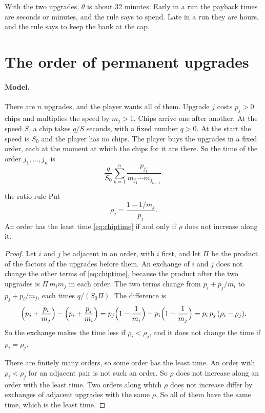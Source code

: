 \documentclass[11pt]{article}
\theoremstyle{boxed}
\begin{document}
With the two upgrades, $\theta$ is about 32 minutes. Early in a run the payback times are
seconds or minutes, and the rule says to spend. Late in a run they are hours, and the rule says
to keep the bank at the cap.

\section{The order of permanent upgrades}\label{sec:chips}

\paragraph{Model.} There are $n$ upgrades, and the player wants all of them. Upgrade $j$ costs
$p_j>0$ chips and multiplies the speed by $m_j>1$. Chips arrive one after another. At the speed
$S$, a chip takes $q/S$ seconds, with a fixed number $q>0$. At the start the speed is $S_0$ and
the player has no chips. The player buys the upgrades in a fixed order, each at the moment at
which the chips for it are there. So the time of the order $j_1,\dots,j_n$ is
\begin{equation}\label{eq:chiptime}
  \frac{q}{S_0}\sum_{k=1}^{n}\frac{p_{j_k}}{m_{j_1}\cdots m_{j_{k-1}}}.
\end{equation}

\begin{maintheorem}{the ratio rule}\label{thm:ratio}
Put
\[
  \rho_j=\frac{1-1/m_j}{p_j}.
\]
An order has the least time \eqref{eq:chiptime} if and only if $\rho$ does not increase along
it.
\end{maintheorem}

\begin{proof}
Let $i$ and $j$ be adjacent in an order, with $i$ first, and let $\Pi$ be the product of the
factors of the upgrades before them. An exchange of $i$ and $j$ does not change the other terms
of \eqref{eq:chiptime}, because the product after the two upgrades is $\Pi\,m_im_j$ in each
order. The two terms change from $p_i+p_j/m_i$ to $p_j+p_i/m_j$, each times $q/(S_0\Pi)$. The
difference is
\[
  \Bigl(p_j+\frac{p_i}{m_j}\Bigr)-\Bigl(p_i+\frac{p_j}{m_i}\Bigr)
  =p_j\Bigl(1-\frac1{m_i}\Bigr)-p_i\Bigl(1-\frac1{m_j}\Bigr)=p_i\,p_j\,(\rho_i-\rho_j).
\]
So the exchange makes the time less if $\rho_i<\rho_j$, and it does not change the time if
$\rho_i=\rho_j$.

There are finitely many orders, so some order has the least time. An order with $\rho_i<\rho_j$
for an adjacent pair is not such an order. So $\rho$ does not increase along an order with the
least time. Two orders along which $\rho$ does not increase differ by exchanges of adjacent
upgrades with the same $\rho$. So all of them have the same time, which is the least time.
\end{proof}
\end{document}
